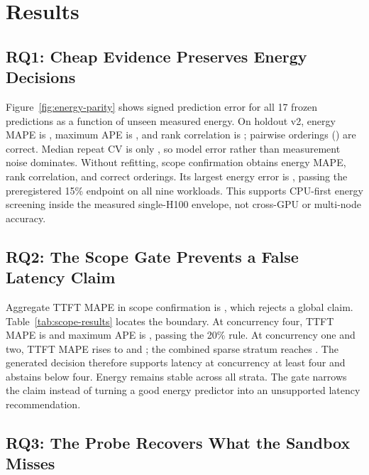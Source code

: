 \section{Results}

\subsection{RQ1: Cheap Evidence Preserves Energy Decisions}

Figure~\ref{fig:energy-parity} shows signed prediction error for all 17 frozen
predictions as a function of unseen measured energy.  On holdout v2, energy MAPE is
\CalibratedEnergyMAPE{}, maximum APE is
\EnergyMaxAPE{}, and rank correlation is \EnergySpearman{}; \EnergyPairwise{}
pairwise orderings (\EnergyPairwisePct{}) are correct.  Median repeat CV is only
\EnergyRepeatCV{}, so model error rather than measurement noise dominates.
Without refitting, scope confirmation obtains \ConfirmationEnergyMAPE{} energy
MAPE, \ConfirmationEnergySpearman{} rank correlation, and
\ConfirmationEnergyPairwise{} correct orderings.  Its largest energy error is
\ConfirmationEnergyMaxAPE{}, passing the preregistered 15\% endpoint on all nine
workloads.  This supports CPU-first energy screening inside the measured
single-H100 envelope, not cross-GPU or multi-node accuracy.



\subsection{RQ2: The Scope Gate Prevents a False Latency Claim}

Aggregate TTFT MAPE in scope confirmation is \ConfirmationTTFTMAPE{}, which
rejects a global claim.  Table~\ref{tab:scope-results} locates the boundary.  At
concurrency four, TTFT MAPE is \KFourTTFTMAPE{} and maximum APE is
\SupportedTTFTMaxAPE{}, passing the 20\% rule.  At concurrency one and two,
TTFT MAPE rises to \KOneTTFTMAPE{} and \KTwoTTFTMAPE{}; the combined sparse
stratum reaches \SparseTTFTMAPE{}.  The generated decision therefore supports
latency at concurrency at least four and abstains below four.  Energy remains
stable across all strata.  The gate narrows the claim instead of turning a good
energy predictor into an unsupported latency recommendation.



\subsection{RQ3: The Probe Recovers What the Sandbox Misses}

